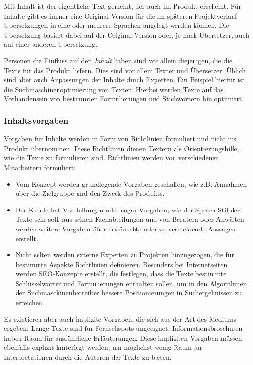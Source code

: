 Mit Inhalt ist der eigentliche Text gemeint, der auch im Produkt erscheint. Für Inhalte gibt es immer eine Original-Version für die im späteren Projektverlauf Übersetzungen in eine oder mehrere Sprachen angelegt werden können. Die Übersetzung basiert dabei auf der Original-Version oder, je nach Übersetzer, auch auf einer anderen Übersetzung.

Personen die Einfluss auf den \emph{Inhalt} haben sind vor allem diejenigen, die die Texte für das Produkt liefern. Dies sind vor allem Texter und Übersetzer. Üblich sind aber auch Anpassungen der Inhalte durch Experten. Ein Beispiel hierfür ist die Suchmaschinenoptimierung von Texten. Hierbei werden Texte auf das Vorhandensein von bestimmten Formulierungen und Stichwörtern hin optimiert. 

\subsubsection{Inhaltsvorgaben}

Vorgaben für Inhalte werden in Form von Richtlinien formuliert und nicht ins Produkt übernommen. Diese Richtlinien dienen Textern als Orientierungshilfe, wie die Texte zu formulieren sind. Richtlinien werden von verschiedenen Mitarbeitern formuliert: 
\begin{itemize}\itemsep -5pt
\item Vom Konzept werden grundlegende Vorgaben geschaffen, wie z.B. Annahmen über die Zielgruppe und den Zweck des Produkts.
\item Der Kunde hat Vorstellungen oder sogar Vorgaben, wie der Sprach-Stil der Texte sein soll, aus seinen Fachabteilungen und von Beratern oder Anwälten werden weitere Vorgaben über erwünschte oder zu vermeidende Aussagen erstellt.
\item Nicht selten werden externe Experten zu Projekten hinzugezogen, die für bestimmte Aspekte Richtlinien definieren. Besonders bei Internetseiten werden SEO-Konzepte erstellt, die festlegen, dass die Texte bestimmte Schlüsselwörter und Formulierungen enthalten sollen, um in den Algorithmen der Suchmaschinenbetreiber bessere Positionierungen in Suchergebnissen zu erreichen.
\end{itemize}
Es existieren aber auch implizite Vorgaben, die sich aus der Art des Mediums ergeben: Lange Texte sind für Fernsehspots ungeeignet, Informationsbroschüren haben Raum für ausführliche Erläuterungen. Diese impliziten Vorgaben müssen ebenfalls explizit hinterlegt werden, um möglichst wenig Raum für Interpretationen durch die Autoren der Texte zu bieten.

